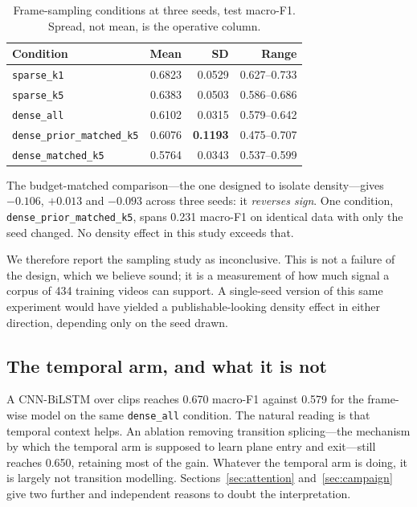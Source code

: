 \documentclass[conference]{IEEEtran}
\begin{document}
\begin{table}[t]
\caption{Frame-sampling conditions at three seeds, test macro-F1. Spread,
not mean, is the operative column.}
\label{tab:sampling}
\centering
\begin{tabular}{lrrr}
\toprule
Condition & Mean & SD & Range \\
\midrule
\texttt{sparse\_k1} & 0.6823 & 0.0529 & 0.627--0.733 \\
\texttt{sparse\_k5} & 0.6383 & 0.0503 & 0.586--0.686 \\
\texttt{dense\_all} & 0.6102 & 0.0315 & 0.579--0.642 \\
\texttt{dense\_prior\_matched\_k5} & 0.6076 & \textbf{0.1193} & 0.475--0.707 \\
\texttt{dense\_matched\_k5} & 0.5764 & 0.0343 & 0.537--0.599 \\
\bottomrule
\end{tabular}
\end{table}

The budget-matched comparison---the one designed to isolate density---gives
$-0.106$, $+0.013$ and $-0.093$ across three seeds: it \emph{reverses sign}.
One condition, \texttt{dense\_prior\_matched\_k5}, spans 0.231 macro-F1 on
identical data with only the seed changed. No density effect in this study
exceeds that.

We therefore report the sampling study as inconclusive. This is not a failure
of the design, which we believe sound; it is a measurement of how much signal a
corpus of 434 training videos can support. A single-seed version of this same
experiment would have yielded a publishable-looking density effect in either
direction, depending only on the seed drawn.

\subsection{The temporal arm, and what it is not}

A CNN-BiLSTM over clips reaches 0.670 macro-F1 against 0.579 for the frame-wise
model on the same \texttt{dense\_all} condition. The natural reading is that
temporal context helps. An ablation removing transition splicing---the
mechanism by which the temporal arm is supposed to learn plane entry and
exit---still reaches 0.650, retaining most of the gain. Whatever the temporal
arm is doing, it is largely not transition modelling.
Sections~\ref{sec:attention} and~\ref{sec:campaign} give two further and
independent reasons to doubt the interpretation.
\end{document}
